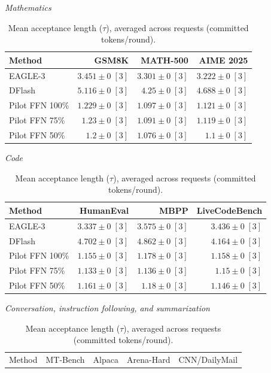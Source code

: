 \documentclass[conference,onecolumn]{IEEEtran}
\begin{document}
\begin{table}[!htp]
\centering\small
\setlength{\tabcolsep}{3pt}
\caption{Mean acceptance length (\(\tau\)), averaged across requests (committed tokens/round).}
\label{tab:appendix-metric-acceptance-length-request-none}
\textit{Mathematics}\par\smallskip
\begin{tabular}{@{}>{\raggedright\arraybackslash}p{3.7cm}rrr@{}}
\toprule
Method & GSM8K & MATH-500 & AIME 2025 \\
\midrule
EAGLE-3 & \(3.451 \pm 0\;[3]\) & \(3.301 \pm 0\;[3]\) & \(3.222 \pm 0\;[3]\) \\
DFlash & \(\mathbf{5.116} \pm 0\;[3]\) & \(\mathbf{4.25} \pm 0\;[3]\) & \(\mathbf{4.688} \pm 0\;[3]\) \\
Pilot FFN 100\% & \(1.229 \pm 0\;[3]\) & \(1.097 \pm 0\;[3]\) & \(1.121 \pm 0\;[3]\) \\
Pilot FFN 75\% & \(1.23 \pm 0\;[3]\) & \(1.091 \pm 0\;[3]\) & \(1.119 \pm 0\;[3]\) \\
Pilot FFN 50\% & \(1.2 \pm 0\;[3]\) & \(1.076 \pm 0\;[3]\) & \(1.1 \pm 0\;[3]\) \\
\bottomrule
\end{tabular}\par\medskip
\textit{Code}\par\smallskip
\begin{tabular}{@{}>{\raggedright\arraybackslash}p{3.7cm}rrr@{}}
\toprule
Method & HumanEval & MBPP & LiveCodeBench \\
\midrule
EAGLE-3 & \(3.337 \pm 0\;[3]\) & \(3.575 \pm 0\;[3]\) & \(3.436 \pm 0\;[3]\) \\
DFlash & \(\mathbf{4.702} \pm 0\;[3]\) & \(\mathbf{4.862} \pm 0\;[3]\) & \(\mathbf{4.164} \pm 0\;[3]\) \\
Pilot FFN 100\% & \(1.155 \pm 0\;[3]\) & \(1.178 \pm 0\;[3]\) & \(1.158 \pm 0\;[3]\) \\
Pilot FFN 75\% & \(1.133 \pm 0\;[3]\) & \(1.136 \pm 0\;[3]\) & \(1.15 \pm 0\;[3]\) \\
Pilot FFN 50\% & \(1.161 \pm 0\;[3]\) & \(1.18 \pm 0\;[3]\) & \(1.146 \pm 0\;[3]\) \\
\bottomrule
\end{tabular}\par\medskip
\textit{Conversation, instruction following, and summarization}\par\smallskip
\begin{tabular}{@{}>{\raggedright\arraybackslash}p{3.7cm}rrrr@{}}
\toprule
Method & MT-Bench & Alpaca & Arena-Hard & CNN/DailyMail \\

\end{tabular}
\end{table}
\end{document}
